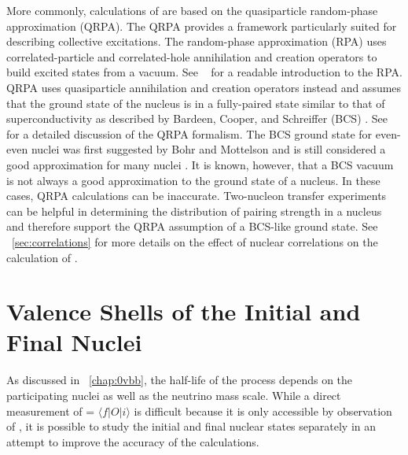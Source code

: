 More commonly, calculations of \NME are based on the quasiparticle random-phase approximation (QRPA).  The QRPA provides a framework particularly suited for describing collective excitations.  The random-phase approximation (RPA) uses correlated-particle and correlated-hole annihilation and creation operators to build excited states from a vacuum.  See {}~\citep{Casten} for a readable introduction to the RPA.  QRPA uses quasiparticle annihilation and creation operators instead and assumes that the ground state of the nucleus is in a fully-paired state \citep{BenderSCMF} similar to that of superconductivity as described by Bardeen, Cooper, and Schreiffer (BCS) \citep{BCS}.  See {}~\citep{SuhonenQRPA} for a detailed discussion of the QRPA formalism.  The BCS ground state for even-even nuclei was first suggested by Bohr and Mottelson \citep{nucleiBCS} and is still considered a good approximation for many nuclei \citep{validRegionsBCS_highMass}.  It is known, however, that a BCS vacuum is not always a good approximation to the ground state of a nucleus\citep{NambuBCS}.  In these cases, QRPA calculations can be inaccurate.  Two-nucleon transfer experiments can be helpful in determining the distribution of pairing strength in a nucleus \citep{Yoshida} and therefore support the QRPA assumption of a BCS-like ground state.  See {\sect}~\ref{sec:correlations} for more details on the effect of nuclear correlations on the calculation of \NME. 

\section{Valence Shells of the Initial and Final Nuclei}
\label{sec:valence}

As discussed in {\chap}~\ref{chap:0vbb}, the half-life of the \zvbb process depends on the participating nuclei as well as the neutrino mass scale.  While a direct measurement of \NME = $\langle f|O|i \rangle$ is difficult because it is only accessible by observation of \zvbb, it is possible to study the initial and final nuclear states separately in an attempt to improve the accuracy of the calculations.  

